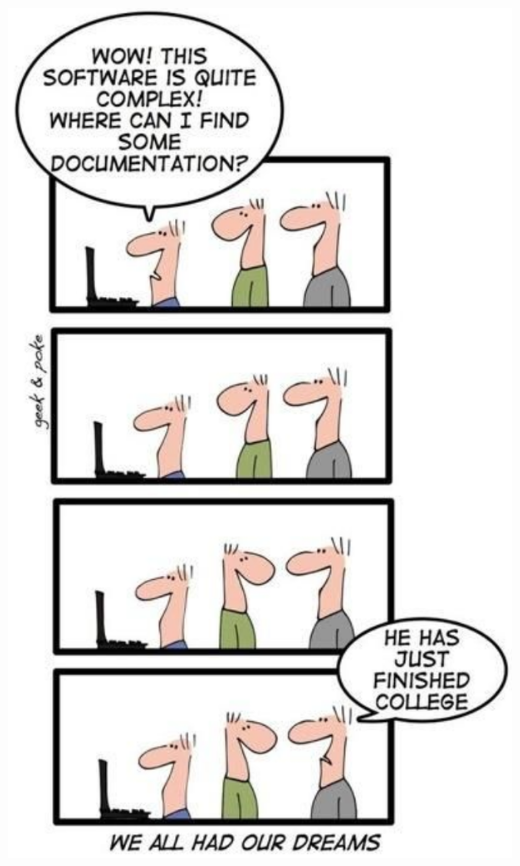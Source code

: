 \documentclass{../../slides-style}
\begin{document}
\begin{frame}
\begin{columns}
\begin{column}{0.4\textwidth}
\begin{center}
                    \includegraphics[height=0.8\textheight]{documentation.png}
                \end{center}
            \end{column}
        \end{columns}
    \end{frame}
\end{document}
